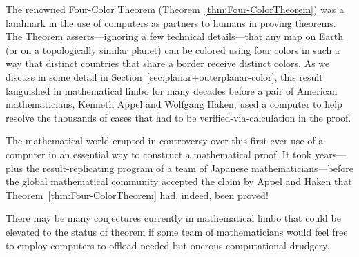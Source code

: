   
The renowned Four-Color Theorem (Theorem~\ref{thm:Four-ColorTheorem}) was a landmark in the use of computers as partners to humans in proving theorems.  The Theorem asserts---ignoring a few technical details---that any map on Earth (or on a topologically similar planet) can be colored using four colors in such a way that distinct countries that share a border receive distinct colors.  As we discuss in some detail in Section~\ref{sec:planar+outerplanar-color}, this result languished in mathematical limbo for many decades before a pair of American mathematicians, Kenneth Appel and Wolfgang Haken, used a computer to help resolve the thousands of cases that had to be verified-via-calculation in the proof.

The mathematical world erupted in controversy over this first-ever use of a computer in an essential way to construct a mathematical proof.  It took years---plus the result-replicating program of a team of Japanese mathematicians---before the global mathematical community accepted the claim by Appel and Haken that Theorem~\ref{thm:Four-ColorTheorem} had, indeed, been proved!

\medskip

There may be many conjectures currently in mathematical limbo that could be elevated to the status of theorem if some team of mathematicians would feel free to employ computers to offload needed but onerous computational drudgery.



%
%
%


